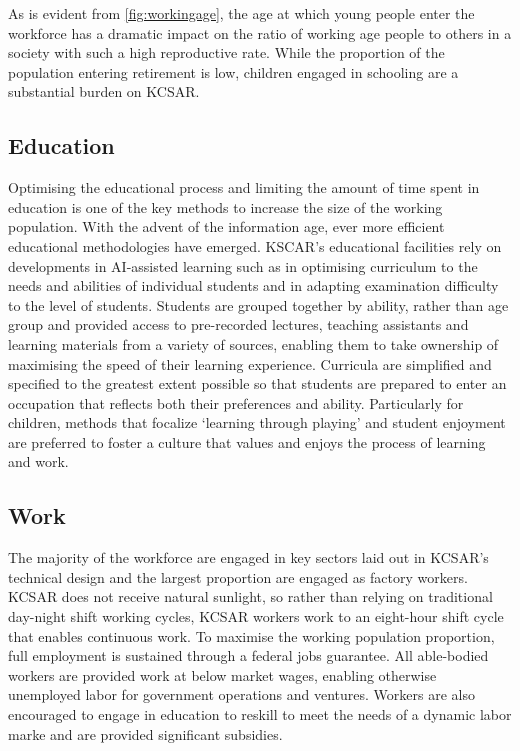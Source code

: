 \documentclass[fleqn,10pt]{Stylesheet} %
\begin{document}
As is evident from \ref{fig:workingage}, the age at which young people enter the workforce has a dramatic impact on the ratio of working age people to others in a society with such a high reproductive rate. While the proportion of the population entering retirement is low, children engaged in schooling are a substantial burden on KCSAR. 

\subsection{Education}
Optimising the educational process and limiting the amount of time spent in education is one of the key methods to increase the size of the working population. With the advent of the information age, ever more efficient educational methodologies have emerged. KSCAR's educational facilities rely on developments in AI-assisted learning such as in optimising curriculum to the needs and abilities of individual students and in adapting examination difficulty to the level of students. Students are grouped together by ability, rather than age group and provided access to pre-recorded lectures, teaching assistants and learning materials from a variety of sources, enabling them to take ownership of maximising the speed of their learning experience. Curricula are simplified and specified to the greatest extent possible so that students are prepared to enter an occupation that reflects both their preferences and ability. Particularly for children, methods that focalize ‘learning through playing’ and student enjoyment are preferred to foster a culture that values and enjoys the process of learning and work.

\subsection{Work}
The majority of the workforce are engaged in key sectors laid out in KCSAR's technical design and the largest proportion are engaged as factory workers. KCSAR does not receive natural sunlight, so rather than relying on traditional day-night shift working cycles, KCSAR workers work to an eight-hour shift cycle that enables continuous work. To maximise the working population proportion, full employment is sustained through a federal jobs guarantee. All able-bodied workers are provided work at below market wages, enabling otherwise unemployed labor for government operations and ventures. Workers are also encouraged to engage in education to reskill to meet the needs of a dynamic labor marke and are provided significant subsidies.   
\end{document}
